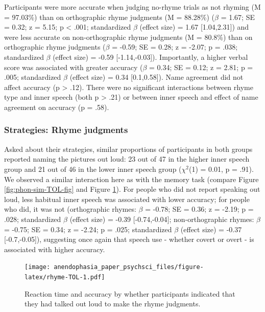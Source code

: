 \documentclass[
  man,a4paper,floatsintext]{apa6}
\begin{document}
Participants were more accurate when judging no-rhyme trials as not rhyming (M = 97.03\%) than on orthographic rhyme judgments (M = 88.28\%) (\(\beta\) = 1.67; SE = 0.32; z = 5.15; p \textless{} .001; standardized \(\beta\) (effect size) = 1.67 {[}1.04,2.31{]}) and were less accurate on non-orthographic rhyme judgments (M = 80.8\%) than on orthographic rhyme judgments (\(\beta\) = -0.59; SE = 0.28; z = -2.07; p = .038; standardized \(\beta\) (effect size) = -0.59 {[}-1.14,-0.03{]}). Importantly, a higher verbal score was associated with greater accuracy (\(\beta\) = 0.34; SE = 0.12; z = 2.81; p = .005; standardized \(\beta\) (effect size) = 0.34 {[}0.1,0.58{]}). Name agreement did not affect accuracy (p \textgreater{} .12). There were no significant interactions between rhyme type and inner speech (both p \textgreater{} .21) or between inner speech and effect of name agreement on accuracy (p = .58).

\hypertarget{strategies-rhyme-judgments}{%
\subsubsection{Strategies: Rhyme judgments}\label{strategies-rhyme-judgments}}

Asked about their strategies, similar proportions of participants in both groups reported naming the pictures out loud: 23 out of 47 in the higher inner speech group and 21 out of 46 in the lower inner speech group (\(\chi^2\)(1) = 0.01, p = .91). We observed a similar interaction here as with the memory task (compare Figure \ref{fig:phon-sim-TOL-fig} and Figure \ref{fig:rhyme-TOL}). For people who did not report speaking out loud, less habitual inner speech was associated with lower accuracy; for people who did, it was not (orthographic rhymes: \(\beta\) = -0.78; SE = 0.36; z = -2.19; p = .028; standardized \(\beta\) (effect size) = -0.39 {[}-0.74,-0.04{]}; non-orthographic rhymes: \(\beta\) = -0.75; SE = 0.34; z = -2.24; p = .025; standardized \(\beta\) (effect size) = -0.37 {[}-0.7,-0.05{]}), suggesting once again that speech use - whether covert or overt - is associated with higher accuracy.

\begin{figure}
\centering
\texttt{[image: anendophasia\_paper\_psychsci\_files/figure-latex/rhyme-TOL-1.pdf]}
\caption{\label{fig:rhyme-TOL}Reaction time and accuracy by whether participants indicated that they had talked out loud to make the rhyme judgments.}
\end{figure}
\end{document}
